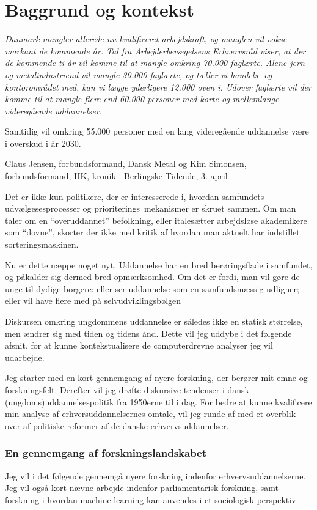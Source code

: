 \part{Baggrund og kontekst}\label{part:baggrund}
\epigraph{\itshape
Danmark mangler allerede nu kvalificeret arbejdskraft, og manglen vil vokse markant de kommende år. Tal fra Arbejderbevægelsens Erhvervsråd viser, at der de kommende ti år vil komme til at mangle omkring 70.000 faglærte. Alene jern- og metalindustriend vil mangle 30.000 faglærte, og tæller vi handels- og kontorområdet med, kan vi lægge yderligere 12.000 oven i. Udover faglærte vil der komme til at mangle flere end 60.000 personer med korte og mellemlange videregående uddannelser.

Samtidig vil omkring 55.000 personer med en lang videregående uddannelse være i overskud i år 2030.
}
{Claus Jensen, forbundsformand, Dansk Metal og Kim Simonsen, forbundsformand, HK, kronik i Berlingske Tidende, 3. april \citeyear{simonsenLadOsGore2016}}

Det er ikke kun politikere, der er interesserede i, hvordan samfundets udvælgesesprocesser og prioriterings\ mekanismer er skruet sammen.
Om man taler om en “overuddannet” befolkning, eller italesætter arbejdsløse akademikere som “dovne”, skorter der ikke med kritik af hvordan man aktuelt har indstillet sorteringsmaskinen.

Nu er dette næppe noget nyt.
Uddannelse har en bred berøringsflade i samfundet, og påkalder sig dermed bred opmærksomhed.
Om det er fordi, man vil gøre de unge til dydige borgere: eller ser uddannelse som en samfundsmæssig udligner; eller vil have flere med på selvudviklingsbølgen \cite{juulDiskurserOmUngdom2013} 

Diskursen omkring ungdommens uddannelse er således ikke en statisk størrelse, men ændrer sig med tiden og tidens ånd.
Dette vil jeg uddybe i det følgende afsnit, for at kunne kontekstualisere de computerdrevne analyser jeg vil udarbejde.

Jeg starter med en kort gennemgang af nyere forskning, der berører mit emne og forskningsfelt.
Derefter vil jeg drøfte diskursive tendenser i dansk (ungdoms)uddannelsespolitik fra 1950erne til i dag.
For bedre at kunne kvalificere min analyse af erhversuddannelsernes omtale, vil jeg runde af med et overblik over af politiske reformer af de danske erhvervsuddannelser.

\section{En gennemgang af forskningslandskabet}\label{sec:litreview}
Jeg vil i det følgende gennemgå nyere forskning indenfor erhvervsuddannelserne.
Jeg vil også kort nævne arbejde indenfor parliamentarisk forskning, samt forskning i hvordan machine learning kan anvendes i et sociologisk perspektiv.

